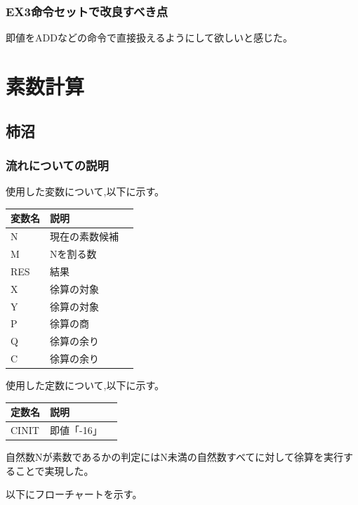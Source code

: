 \documentclass[dvipdfmx,12pt]{jreport}
\begin{document}
\subsubsection{EX3命令セットで改良すべき点}
即値をADDなどの命令で直接扱えるようにして欲しいと感じた。

\section*{素数計算}
\subsection*{柿沼}
\subsubsection*{流れについての説明}
使用した変数について,以下に示す。
\begin{table}[h]
  \begin{tabular}{|l|l|l|} \hline
    変数名 & 説明 \\ \hline
    N & 現在の素数候補 \\ \hline
    M & Nを割る数 \\ \hline
    RES & 結果 \\ \hline
    X & 徐算の対象 \\ \hline
    Y & 徐算の対象 \\ \hline
    P & 徐算の商 \\ \hline
    Q & 徐算の余り \\ \hline
    C & 徐算の余り \\ \hline
  \end{tabular}
\end{table}
使用した定数について,以下に示す。
\begin{table}[h]
  \begin{tabular}{|l|l|l|} \hline
    定数名 & 説明 \\ \hline
    CINIT & 即値「-16」 \\ \hline
  \end{tabular}
\end{table}

自然数Nが素数であるかの判定にはN未満の自然数すべてに対して徐算を実行することで実現した。

以下にフローチャートを示す。 \\
\end{document}
